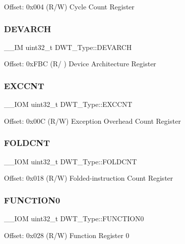 Offset\+: 0x004 (R/W) Cycle Count Register \mbox{\label{struct_d_w_t___type_ae60dbff3143d15cd04ac984084d8fbc7}} 
\subsubsection{\texorpdfstring{DEVARCH}{DEVARCH}}
{\footnotesize\ttfamily \+\_\+\+\_\+\+IM uint32\+\_\+t D\+W\+T\+\_\+\+Type\+::\+D\+E\+V\+A\+R\+CH}

Offset\+: 0x\+F\+BC (R/ ) Device Architecture Register \mbox{\label{struct_d_w_t___type_a9fe20c16c5167ca61486caf6832686d1}} 
\subsubsection{\texorpdfstring{EXCCNT}{EXCCNT}}
{\footnotesize\ttfamily \+\_\+\+\_\+\+I\+OM uint32\+\_\+t D\+W\+T\+\_\+\+Type\+::\+E\+X\+C\+C\+NT}

Offset\+: 0x00C (R/W) Exception Overhead Count Register \mbox{\label{struct_d_w_t___type_a1cfc48384ebd8fd8fb7e5d955aae6c97}} 
\subsubsection{\texorpdfstring{FOLDCNT}{FOLDCNT}}
{\footnotesize\ttfamily \+\_\+\+\_\+\+I\+OM uint32\+\_\+t D\+W\+T\+\_\+\+Type\+::\+F\+O\+L\+D\+C\+NT}

Offset\+: 0x018 (R/W) Folded-\/instruction Count Register \mbox{\label{struct_d_w_t___type_a579ae082f58a0317b7ef029b20f52889}} 
\subsubsection{\texorpdfstring{FUNCTION0}{FUNCTION0}}
{\footnotesize\ttfamily \+\_\+\+\_\+\+I\+OM uint32\+\_\+t D\+W\+T\+\_\+\+Type\+::\+F\+U\+N\+C\+T\+I\+O\+N0}

Offset\+: 0x028 (R/W) Function Register 0 \mbox{\label{struct_d_w_t___type_a8dfcf25675f9606aa305c46e85182e4e}} 
